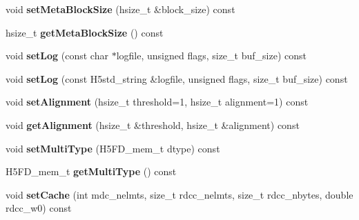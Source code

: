 \begin{DoxyCompactItemize}
void {\bfseries set\+Meta\+Block\+Size} (hsize\+\_\+t \&block\+\_\+size) const
\item 
\mbox{\label{class_h5_1_1_file_acc_prop_list_a4bc35992eaf18dd313ab1c0abae968f1}} 
hsize\+\_\+t {\bfseries get\+Meta\+Block\+Size} () const
\item 
\mbox{\label{class_h5_1_1_file_acc_prop_list_abf0db259d93fe6a0c1b2cdac031a9d13}} 
void {\bfseries set\+Log} (const char $\ast$logfile, unsigned flags, size\+\_\+t buf\+\_\+size) const
\item 
\mbox{\label{class_h5_1_1_file_acc_prop_list_adc69c718f00f7d164a01aeefa519a140}} 
void {\bfseries set\+Log} (const H5std\+\_\+string \&logfile, unsigned flags, size\+\_\+t buf\+\_\+size) const
\item 
\mbox{\label{class_h5_1_1_file_acc_prop_list_a4bb1a9fa53ef7cd437416d472e9f6e18}} 
void {\bfseries set\+Alignment} (hsize\+\_\+t threshold=1, hsize\+\_\+t alignment=1) const
\item 
\mbox{\label{class_h5_1_1_file_acc_prop_list_a26ce3c7455559229481b61a27f746bc3}} 
void {\bfseries get\+Alignment} (hsize\+\_\+t \&threshold, hsize\+\_\+t \&alignment) const
\item 
\mbox{\label{class_h5_1_1_file_acc_prop_list_a2f4b907e631fde5a601538da442a45b5}} 
void {\bfseries set\+Multi\+Type} (H5\+F\+D\+\_\+mem\+\_\+t dtype) const
\item 
\mbox{\label{class_h5_1_1_file_acc_prop_list_aae7718bc0aa467b1a6d9ff24c726baa7}} 
H5\+F\+D\+\_\+mem\+\_\+t {\bfseries get\+Multi\+Type} () const
\item 
\mbox{\label{class_h5_1_1_file_acc_prop_list_a4df2b106678ed74ea6fc98a3e5761a28}} 
void {\bfseries set\+Cache} (int mdc\+\_\+nelmts, size\+\_\+t rdcc\+\_\+nelmts, size\+\_\+t rdcc\+\_\+nbytes, double rdcc\+\_\+w0) const
\item 
\mbox{\label{class_h5_1_1_file_acc_prop_list_a7e2e7ac3b631d82971f2c50788be3861}} 

\end{DoxyCompactItemize}

